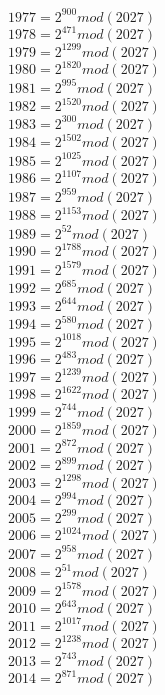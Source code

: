 \documentclass[12pt, letterpaper]{article}
\begin{document}
\begin{itemize}
\begin{multicols}{3}
$1977= 2^{900} mod (2027)$\\
$1978= 2^{471} mod (2027)$\\
$1979= 2^{1299} mod (2027)$\\
$1980= 2^{1820} mod (2027)$\\
$1981= 2^{995} mod (2027)$\\
$1982= 2^{1520} mod (2027)$\\
$1983= 2^{300} mod (2027)$\\
$1984= 2^{1502} mod (2027)$\\
$1985= 2^{1025} mod (2027)$\\
$1986= 2^{1107} mod (2027)$\\
$1987= 2^{959} mod (2027)$\\
$1988= 2^{1153} mod (2027)$\\
$1989= 2^{52} mod (2027)$\\
$1990= 2^{1788} mod (2027)$\\
$1991= 2^{1579} mod (2027)$\\
$1992= 2^{685} mod (2027)$\\
$1993= 2^{644} mod (2027)$\\
$1994= 2^{580} mod (2027)$\\
$1995= 2^{1018} mod (2027)$\\
$1996= 2^{483} mod (2027)$\\
$1997= 2^{1239} mod (2027)$\\
$1998= 2^{1622} mod (2027)$\\
$1999= 2^{744} mod (2027)$\\
$2000= 2^{1859} mod (2027)$\\
$2001= 2^{872} mod (2027)$\\
$2002= 2^{899} mod (2027)$\\
$2003= 2^{1298} mod (2027)$\\
$2004= 2^{994} mod (2027)$\\
$2005= 2^{299} mod (2027)$\\
$2006= 2^{1024} mod (2027)$\\
$2007= 2^{958} mod (2027)$\\
$2008= 2^{51} mod (2027)$\\
$2009= 2^{1578} mod (2027)$\\
$2010= 2^{643} mod (2027)$\\
$2011= 2^{1017} mod (2027)$\\
$2012= 2^{1238} mod (2027)$\\
$2013= 2^{743} mod (2027)$\\
$2014= 2^{871} mod (2027)$\\

\end{multicols}
\end{itemize}
\end{document}
